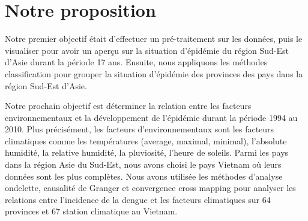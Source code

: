 %

\section{Notre proposition}
Notre premier objectif était d'effectuer un pré-traitement sur les données, puis le visualiser pour avoir un aperçu sur la situation d'épidémie du région Sud-Est d'Asie durant la période 17 ans. Ensuite, nous appliquons les méthodes classification pour grouper la situation d'épidémie des provinces des pays dans la région Sud-Est d'Asie.

Notre prochain objectif est déterminer la relation entre les facteurs environnementaux et la développement de l'épidémie durant la période 1994 au 2010. Plus précisément, les facteurs d'environnementaux sont les facteurs climatiques comme les températures (average, maximal, minimal), l'absolute humidité, la relative humidité, la pluviosité, l'heure de soleils. Parmi les pays dans la région Asie du Sud-Est, nous avons choisi le pays Vietnam où leurs données sont les plus complètes. Nous avons utilisée les méthodes d'analyse ondelette, causalité de Granger et convergence cross mapping pour analyser les relations entre l'incidence de la dengue et les facteurs climatiques sur 64 provinces et 67 station climatique au Vietnam. 

